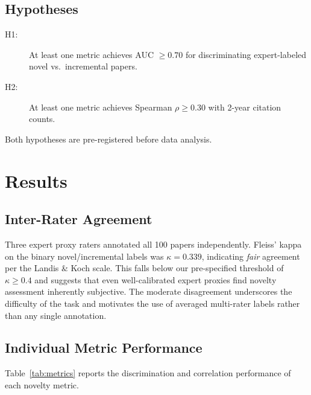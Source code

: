 \documentclass[11pt,a4paper]{article}
\begin{document}
\subsection{Hypotheses}
\label{sec:hypotheses}

\begin{description}
  \item[H1:] At least one metric achieves AUC $\geq 0.70$ for
    discriminating expert-labeled novel vs.\ incremental papers.
  \item[H2:] At least one metric achieves Spearman $\rho \geq 0.30$
    with 2-year citation counts.
\end{description}

Both hypotheses are pre-registered before data analysis.

\section{Results}
\label{sec:results}

\subsection{Inter-Rater Agreement}

Three expert proxy raters annotated all 100 papers independently.
Fleiss' kappa on the binary novel/incremental labels was $\kappa = 0.339$,
indicating \emph{fair} agreement per the Landis \& Koch scale.  This
falls below our pre-specified threshold of $\kappa \geq 0.4$ and
suggests that even well-calibrated expert proxies find novelty assessment
inherently subjective.  The moderate disagreement underscores the
difficulty of the task and motivates the use of averaged multi-rater
labels rather than any single annotation.

\subsection{Individual Metric Performance}

Table~\ref{tab:metrics} reports the discrimination and correlation
performance of each novelty metric.
\end{document}
